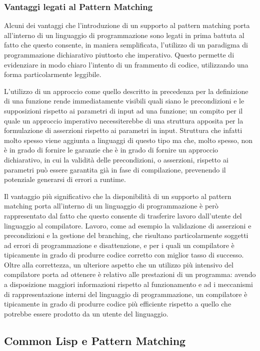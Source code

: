\subsubsection{Vantaggi legati al Pattern Matching}

Alcuni dei vantaggi che l'introduzione di un supporto al pattern matching porta
all’interno di un linguaggio di programmazione sono legati in prima battuta al
fatto che questo consente, in maniera semplificata, l’utilizzo di un paradigma
di programmazione dichiarativo piuttosto che imperativo. Questo permette di
evidenziare in modo chiaro l’intento di un frammento di codice, utilizzando una
forma particolarmente leggibile.

L’utilizzo di un approccio come quello descritto in precedenza per la
definizione di una funzione rende immediatamente visibili quali siano le
precondizioni e le supposizioni rispetto ai parametri di input ad una funzione;
un compito per il quale un approccio imperativo necessiterebbe di una struttura
apposita per la formulazione di asserzioni rispetto ai parametri in input.
Struttura che infatti molto spesso viene aggiunta a linguaggi di questo tipo ma
che, molto spesso, non è in grado di fornire le garanzie che è in grado di
fornire un approccio dichiarativo, in cui la validità delle precondizioni, o
asserzioni, rispetto ai parametri può essere garantita già in fase di
compilazione, prevenendo il potenziale generarsi di errori a runtime.

Il vantaggio più significativo che la disponibilità di un supporto al pattern
matching porta all’interno di un linguaggio di programmazione è però
rappresentato dal fatto che questo consente di trasferire lavoro dall’utente del
linguaggio al compilatore. Lavoro, come ad esempio la validazione di asserzioni
e precondizioni e la gestione del branching, che risultano particolarmente
soggetti ad errori di programmazione e disattenzione, e per i quali un
compilatore è tipicamente in grado di produrre codice corretto con miglior tasso
di successo. Oltre alla correttezza, un ulteriore aspetto che un utilizzo più
intensivo del compilatore porta ad ottenere è relativo alle prestazioni di un
programma: avendo a disposizione maggiori informazioni rispetto al funzionamento
e ad i meccanismi di rappresentazione interni del linguaggio di programmazione,
un compilatore è tipicamente in grado di produrre codice più efficiente rispetto
a quello che potrebbe essere prodotto da un utente del linguaggio.

\subsection{Common Lisp e Pattern Matching}


